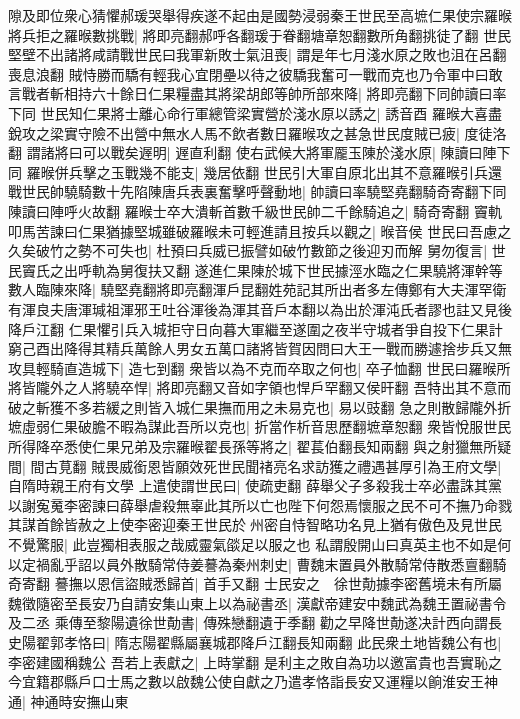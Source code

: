 隙及即位衆心猜懼郝瑗哭舉得疾遂不起由是國勢浸弱秦王世民至高墌仁果使宗羅㬋將兵拒之羅㬋數挑戰|{
	將即亮翻郝呼各翻瑗于眷翻塘章恕翻數所角翻挑徒了翻}
世民堅壁不出諸將咸請戰世民曰我軍新敗士氣沮喪|{
	謂是年七月淺水原之敗也沮在呂翻喪息浪翻}
賊恃勝而驕有輕我心宜閉壘以待之彼驕我奮可一戰而克也乃令軍中曰敢言戰者斬相持六十餘日仁果糧盡其將梁胡郎等帥所部來降|{
	將即亮翻下同帥讀曰率下同}
世民知仁果將士離心命行軍總管梁實營於淺水原以誘之|{
	誘音酉}
羅㬋大喜盡銳攻之梁實守險不出營中無水人馬不飲者數日羅㬋攻之甚急世民度賊已疲|{
	度徒洛翻}
謂諸將曰可以戰矣遟明|{
	遟直利翻}
使右武候大將軍龎玉陳於淺水原|{
	陳讀曰陣下同}
羅㬋併兵擊之玉戰幾不能支|{
	幾居依翻}
世民引大軍自原北出其不意羅㬋引兵還戰世民帥驍騎數十先陷陳唐兵表裏奮擊呼聲動地|{
	帥讀曰率驍堅堯翻騎奇寄翻下同陳讀曰陣呼火故翻}
羅㬋士卒大潰斬首數千級世民帥二千餘騎追之|{
	騎奇寄翻}
竇軌叩馬苦諫曰仁果猶據堅城雖破羅㬋未可輕進請且按兵以觀之|{
	㬋音侯}
世民曰吾慮之久矣破竹之勢不可失也|{
	杜預曰兵威已振譬如破竹數節之後迎刃而解}
舅勿復言|{
	世民竇氏之出呼軌為舅復扶又翻}
遂進仁果陳於城下世民據涇水臨之仁果驍將渾幹等數人臨陳來降|{
	驍堅堯翻將即亮翻渾戶昆翻姓苑記其所出者多左傳鄭有大夫渾罕衛有渾良夫唐渾瑊祖渾邪王吐谷渾後為渾其音戶本翻以為出於渾沌氏者謬也註又見後降戶江翻}
仁果懼引兵入城拒守日向暮大軍繼至遂圍之夜半守城者爭自投下仁果計窮己酉出降得其精兵萬餘人男女五萬口諸將皆賀因問曰大王一戰而勝遽捨步兵又無攻具輕騎直造城下|{
	造七到翻}
衆皆以為不克而卒取之何也|{
	卒子恤翻}
世民曰羅㬋所將皆隴外之人將驍卒悍|{
	將即亮翻又音如字領也悍戶罕翻又侯旰翻}
吾特出其不意而破之斬獲不多若緩之則皆入城仁果撫而用之未易克也|{
	易以豉翻}
急之則散歸隴外折墌虛弱仁果破膽不暇為謀此吾所以克也|{
	折當作析音思歷翻墌章恕翻}
衆皆悅服世民所得降卒悉使仁果兄弟及宗羅㬋翟長孫等將之|{
	翟萇伯翻長知兩翻}
與之射獵無所疑間|{
	間古莧翻}
賊畏威銜恩皆願效死世民聞禇亮名求訪獲之禮遇甚厚引為王府文學|{
	自隋時親王府有文學}
上遣使謂世民曰|{
	使疏吏翻}
薛舉父子多殺我士卒必盡誅其黨以謝寃䰟李密諫曰薛舉虐殺無辜此其所以亡也陛下何怨焉懷服之民不可不撫乃命戮其謀首餘皆赦之上使李密迎秦王世民於州密自恃智略功名見上猶有傲色及見世民不覺驚服|{
	此豈獨相表服之哉威靈氣燄足以服之也}
私謂殷開山曰真英主也不如是何以定禍亂乎詔以員外散騎常侍姜謩為秦州刺史|{
	曹魏末置員外散騎常侍散悉亶翻騎奇寄翻}
謩撫以恩信盜賊悉歸首|{
	首手又翻}
士民安之　徐世勣據李密舊境未有所屬魏徵隨密至長安乃自請安集山東上以為祕書丞|{
	漢獻帝建安中魏武為魏王置祕書令及二丞}
乘傳至黎陽遺徐世勣書|{
	傳殊戀翻遺于季翻}
勸之早降世勣遂决計西向謂長史陽翟郭孝恪曰|{
	隋志陽翟縣屬襄城郡降戶江翻長知兩翻}
此民衆土地皆魏公有也|{
	李密建國稱魏公}
吾若上表獻之|{
	上時掌翻}
是利主之敗自為功以邀富貴也吾實恥之今宜籍郡縣戶口士馬之數以啟魏公使自獻之乃遣孝恪詣長安又運糧以餉淮安王神通|{
	神通時安撫山東}
